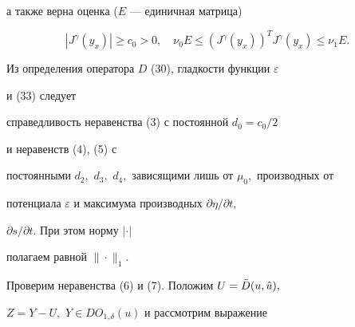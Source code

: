 а также верна оценка ($E$ --- единичная матрица) 


\begin{equation} 


|J^\gamma(y_x)|\ge c_0>0,\quad \nu_0E \le (J^\gamma(y_x))^T 


 J^\gamma(y_x)\le \nu_1E. 


\end{equation} 


Из определения оператора $D$ (30), гладкости функции $\varepsilon$ 


и (33) следует 


справедливость неравенства (3) с постоянной $d_0=c_0/2$ 


и неравенств (4), (5) с 


постоянными $d_2,$ $d_3,$ $d_4,$ зависящими лишь от $\mu_0,$ производных от 


потенциала $\varepsilon$ и максимума производных $\partial\eta/\partial t,$ 


$\partial s/\partial t.$ При этом норму $|\cdot|$ 


полагаем равной $\|\cdot\|_1.$ 


 


Проверим неравенства (6) и (7). Положим $U=\Tilde D(u,\Hat u),$ 


$Z=Y-U,$ $Y\in DO_{1,\delta}(u)$ и рассмотрим выражение 


